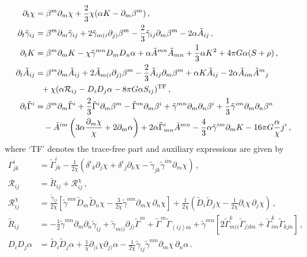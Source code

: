 \documentclass[11pt]{report}  %
\begin{document}
\begin{align}
  \partial_t \chi &= \beta^m\partial_m \chi
  + \frac{2}{3}\chi( \alpha K-\partial_m \beta^m)\,,
  \label{eq:chit} \\
  \partial_t \tilde{\gamma}_{ij} &=
  \beta^m\partial_m \tilde{\gamma}_{ij}
  + 2 \tilde{\gamma}_{m(i}\partial_{j)}\beta^m
  - \frac{2}{3}\tilde{\gamma}_{ij}\partial_m \beta^m
  -2\alpha \tilde{A}_{ij}\,, \\
  \partial_t K &=
  \beta^m\partial_m K
  -\chi \tilde{\gamma}^{mn}D_m D_n\alpha
  +\alpha \tilde{A}^{mn}\tilde{A}_{mn}
  +\frac{1}{3}\alpha K^2
  +4\pi G \alpha (S+\rho)\,, \\
  \partial_t \tilde{A}_{ij} &=
  \beta^m\partial_m \tilde{A}_{ij}
  +2\tilde{A}_{m(i}\partial_{j)}\beta^m
  -\frac{2}{3}\tilde{A}_{ij}\partial_m \beta^m
  +\alpha K \tilde{A}_{ij}
  -2\alpha\tilde{A}_{im}\tilde{A}^{m}{}_j
  \nonumber \\
  &~~
  +\chi (\alpha \mathcal{R}_{ij}-D_i D_j \alpha -8\pi G
        \alpha S_{ij})^{\rm TF}\,, \\
  \partial_t \tilde{\Gamma}^i &=
  \beta^m \partial_m \tilde{\Gamma}^i
  +\frac{2}{3}\tilde{\Gamma}^i\partial_m \beta^m
  -\tilde{\Gamma}^m\partial_m \beta^i
  +\tilde{\gamma}^{mn}\partial_m\partial_n \beta^i
  +\frac{1}{3}\tilde{\gamma}^{im}\partial_m\partial_n\beta^n
  \nonumber \\
  &~~~
  -\tilde{A}^{im}\left( 3\alpha \frac{\partial_m \chi}{\chi}
        +2\partial_m \alpha\right)
  +2\alpha\tilde{\Gamma}^i_{mn}\tilde{A}^{mn}
  -\frac{4}{3}\alpha\tilde{\gamma}^{im}\partial_m K
  -16\pi G \frac{\alpha}{\chi}j^i\,,
  \label{eq:Gammait}
\end{align}
%
where `TF' denotes the trace-free part and auxiliary expressions
are given by
%
\begin{align}
  \Gamma^i_{jk} &=
  \tilde{\Gamma}^i_{jk}
  -\frac{1}{2\chi}( \delta^i{}_k\partial_j \chi
        +\delta^i{}_j\partial_k \chi
        -\tilde{\gamma}_{jk}\tilde{\gamma}^{im}\partial_m \chi)
        \,, \nonumber\\
  \mathcal{R}_{ij} &= \tilde{R}_{ij}+ \mathcal{R}^{\chi}_{ij}
  \,, \nonumber\\
  \mathcal{R}^{\chi}_{ij} &=
  \frac{\tilde{\gamma}_{ij}}{2\chi}
  \left[
  \tilde{\gamma}^{mn}\tilde{D}_m\tilde{D}_n \chi
  -\frac{3}{2\chi}\tilde{\gamma}^{mn}\partial_m \chi\,\partial_n \chi
  \right]
  +\frac{1}{2\chi}
  \left(
  \tilde{D}_i \tilde{D}_j \chi
  -\frac{1}{2\chi}\partial_i \chi \,\partial_j \chi
  \right)
  \,, \nonumber\\
  \tilde{R}_{ij} &=
  -\frac{1}{2}\tilde{\gamma}^{mn}\partial_m \partial_n\tilde{\gamma}_{ij}
  +\tilde{\gamma}_{m(i}\partial_{j)}\tilde{\Gamma}^m
  +\tilde{\Gamma}^m\tilde{\Gamma}_{(ij)m}
  +\tilde{\gamma}^{mn}
  \left[
  2\tilde{\Gamma}^k_{m(i}\tilde{\Gamma}_{j)kn}
  +\tilde{\Gamma}^k_{im}\tilde{\Gamma}_{kjn}
  \right]\,,\nonumber\\
  D_i D_j \alpha &=
  \tilde{D}_i \tilde{D}_j \alpha
  + \frac{1}{\chi}\partial_{(i}\chi \partial_{j)}\alpha
  -\frac{1}{2\chi}\tilde{\gamma}_{ij}\tilde{\gamma}^{mn}
        \partial_m \chi \,\partial_n \alpha\,.
\end{align}
\end{document}
